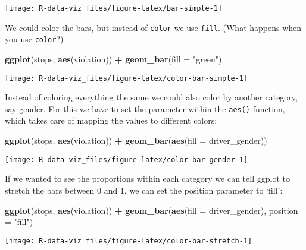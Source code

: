 \documentclass[]{book}
\newenvironment{Shaded}{\begin{snugshade}}{\end{snugshade}}
\newcommand{\DataTypeTok}[1]{\textcolor[rgb]{0.13,0.29,0.53}{#1}}
\newcommand{\KeywordTok}[1]{\textcolor[rgb]{0.13,0.29,0.53}{\textbf{#1}}}
\newcommand{\NormalTok}[1]{#1}
\newcommand{\OperatorTok}[1]{\textcolor[rgb]{0.81,0.36,0.00}{\textbf{#1}}}
\newcommand{\StringTok}[1]{\textcolor[rgb]{0.31,0.60,0.02}{#1}}
\begin{document}
\texttt{[image: R-data-viz\_files/figure-latex/bar-simple-1]}

We could color the bars, but instead of \texttt{color} we use \texttt{fill}. (What happens when you use \texttt{color}?)

\begin{Shaded}
\begin{Highlighting}[]
\KeywordTok{ggplot}\NormalTok{(stops, }\KeywordTok{aes}\NormalTok{(violation)) }\OperatorTok{+}\StringTok{ }
\StringTok{  }\KeywordTok{geom_bar}\NormalTok{(}\DataTypeTok{fill =} \StringTok{"green"}\NormalTok{)}
\end{Highlighting}
\end{Shaded}

\texttt{[image: R-data-viz\_files/figure-latex/color-bar-simple-1]}

Instead of coloring everything the same we could also color by another category, say gender. For this we have to set the parameter within the \texttt{aes()} function, which takes care of mapping the values to different colors:

\begin{Shaded}
\begin{Highlighting}[]
\KeywordTok{ggplot}\NormalTok{(stops, }\KeywordTok{aes}\NormalTok{(violation)) }\OperatorTok{+}\StringTok{ }
\StringTok{  }\KeywordTok{geom_bar}\NormalTok{(}\KeywordTok{aes}\NormalTok{(}\DataTypeTok{fill =}\NormalTok{ driver_gender))}
\end{Highlighting}
\end{Shaded}

\texttt{[image: R-data-viz\_files/figure-latex/color-bar-gender-1]}

If we wanted to see the proportions within each category we can tell ggplot to stretch the bars between 0 and 1, we can set the position parameter to `fill':

\begin{Shaded}
\begin{Highlighting}[]
\KeywordTok{ggplot}\NormalTok{(stops, }\KeywordTok{aes}\NormalTok{(violation)) }\OperatorTok{+}\StringTok{ }
\StringTok{  }\KeywordTok{geom_bar}\NormalTok{(}\KeywordTok{aes}\NormalTok{(}\DataTypeTok{fill =}\NormalTok{ driver_gender), }\DataTypeTok{position =} \StringTok{"fill"}\NormalTok{)}
\end{Highlighting}
\end{Shaded}

\texttt{[image: R-data-viz\_files/figure-latex/color-bar-stretch-1]}
\end{document}

